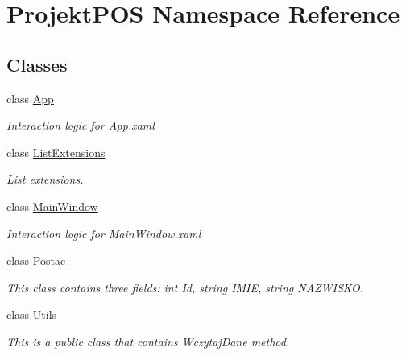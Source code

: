 \hypertarget{namespace_projekt_p_o_s}{}\section{Projekt\+P\+OS Namespace Reference}
\label{namespace_projekt_p_o_s}
\subsection*{Classes}
\begin{DoxyCompactItemize}
\item 
class \hyperlink{class_projekt_p_o_s_1_1_app}{App}
\begin{DoxyCompactList}\small\item\em Interaction logic for App.\+xaml \end{DoxyCompactList}\item 
class \hyperlink{class_projekt_p_o_s_1_1_list_extensions}{List\+Extensions}
\begin{DoxyCompactList}\small\item\em List extensions. \end{DoxyCompactList}\item 
class \hyperlink{class_projekt_p_o_s_1_1_main_window}{Main\+Window}
\begin{DoxyCompactList}\small\item\em Interaction logic for Main\+Window.\+xaml \end{DoxyCompactList}\item 
class \hyperlink{class_projekt_p_o_s_1_1_postac}{Postac}
\begin{DoxyCompactList}\small\item\em This class contains three fields\+: int Id, string I\+M\+IE, string N\+A\+Z\+W\+I\+S\+KO. \end{DoxyCompactList}\item 
class \hyperlink{class_projekt_p_o_s_1_1_utils}{Utils}
\begin{DoxyCompactList}\small\item\em This is a public class that contains Wczytaj\+Dane method. \end{DoxyCompactList}\end{DoxyCompactItemize}
